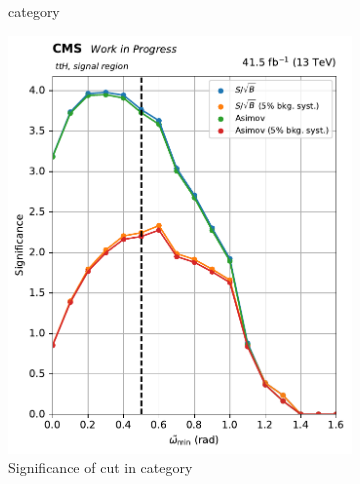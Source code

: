 \begin{figure}[htbp]
\begin{subfigure}[b]{0.27\textwidth}
        \caption{\ggF category}
    \end{subfigure}

    \begin{subfigure}[b]{0.27\textwidth}
        \includegraphics[width=\textwidth]{figures/category_optimisations/significance_ttH_min_omega_tilde_all.pdf}
        \caption{Significance of cut in \ttH category}
    \end{subfigure}
    \hfill
    \begin{subfigure}[b]{0.27\textwidth}

\end{subfigure}
\end{figure}
